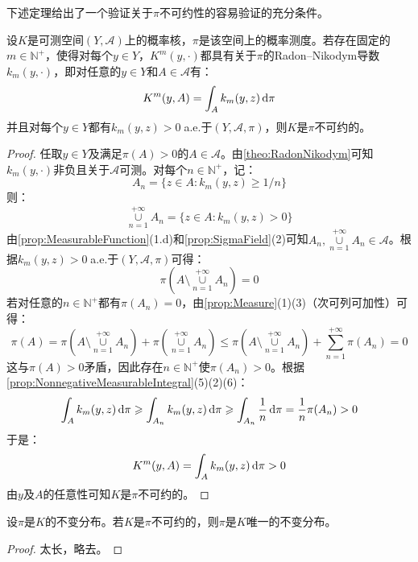 下述定理给出了一个验证关于$\pi$不可约性的容易验证的充分条件。
\begin{theorem}\label{theo:IrreducibilityDensity}
	设$K$是可测空间$(Y,\mathscr{A})$上的概率核，$\pi$是该空间上的概率测度。若存在固定的$m\in\mathbb{N}^+$，使得对每个$y\in Y$，$K^m(y,\cdot)$都具有关于$\pi$的Radon--Nikodym导数$k_m(y,\cdot)$，即对任意的$y\in Y$和$A\in\mathscr{A}$有：
	\begin{equation*}
		K^m(y,A)=\int_{A}k_m(y,z)\mathop{}\!\mathrm{d}\pi
	\end{equation*}
	并且对每个$y\in Y$都有$k_m(y,z)>0\;$a.e.于$(Y,\mathscr{A},\pi)$，则$K$是$\pi$不可约的。
\end{theorem}
\begin{proof}
	任取$y\in Y$及满足$\pi(A)>0$的$A\in\mathscr{A}$。由\cref{theo:RadonNikodym}可知$k_m(y,\cdot)$非负且关于$\mathscr{A}$可测。对每个$n\in\mathbb{N}^+$，记：
	\begin{equation*}
		A_n=\{z\in A:k_m(y,z)\geqslant1/n\}
	\end{equation*}
	则：
	\begin{equation*}
		\underset{n=1}{\overset{+\infty}{\cup}}A_n=\{z\in A:k_m(y,z)>0\}
	\end{equation*}
	由\cref{prop:MeasurableFunction}(1.d)和\cref{prop:SigmaField}(2)可知$A_n,\underset{n=1}{\overset{+\infty}{\cup}}A_n\in\mathscr{A}$。根据$k_m(y,z)>0\;$a.e.于$(Y,\mathscr{A},\pi)$可得：
	\begin{equation*}
		\pi\left(A\setminus\underset{n=1}{\overset{+\infty}{\cup}}A_n\right)=0
	\end{equation*}
	若对任意的$n\in\mathbb{N}^+$都有$\pi(A_n)=0$，由\cref{prop:Measure}(1)(3)（次可列可加性）可得：
	\begin{equation*}
		\pi(A)=\pi\left(A\setminus\underset{n=1}{\overset{+\infty}{\cup}}A_n\right)+\pi\left(\underset{n=1}{\overset{+\infty}{\cup}}A_n\right)\leqslant\pi\left(A\setminus\underset{n=1}{\overset{+\infty}{\cup}}A_n\right)+\sum_{n=1}^{+\infty}\pi(A_n)=0
	\end{equation*}
	这与$\pi(A)>0$矛盾，因此存在$n\in\mathbb{N}^+$使$\pi(A_n)>0$。根据\cref{prop:NonnegativeMeasurableIntegral}(5)(2)(6)：
	\begin{equation*}
		\int_{A}k_m(y,z)\mathop{}\!\mathrm{d}\pi\geqslant\int_{A_n}k_m(y,z)\mathop{}\!\mathrm{d}\pi\geqslant\int_{A_n}\frac{1}{n}\mathop{}\!\mathrm{d}\pi=\frac{1}{n}\pi(A_n)>0
	\end{equation*}
	于是：
	\begin{equation*}
		K^m(y,A)=\int_{A}k_m(y,z)\mathop{}\!\mathrm{d}\pi>0
	\end{equation*}
	由$y$及$A$的任意性可知$K$是$\pi$不可约的。
\end{proof}
\begin{theorem}\label{theo:IrreducibleInvariantUniqueness}
	设$\pi$是$K$的不变分布。若$K$是$\pi$不可约的，则$\pi$是$K$唯一的不变分布。
\end{theorem}
\begin{proof}
	太长，略去。
\end{proof}
